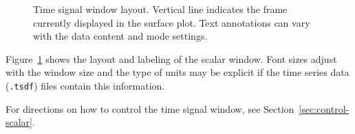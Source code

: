 \begin{figure}[htb]
  \begin{makeimage}
  \end{makeimage}
  \timesignal
  \caption{\label{fig:scalar} Time signal window layout.  Vertical line
  indicates the frame currently displayed in the surface plot.   Text
  annotations can vary with the data content and mode settings.}
\end{figure}

Figure~\ref{fig:scalar} shows the layout and labeling of the scalar
window.  Font sizes adjust with the window size and the type of units may
be explicit if the time series data (\texttt{.tsdf}) files contain this
information. 

For directions on how to control the time signal window, see
Section~\ref{sec:control-scalar}. 



